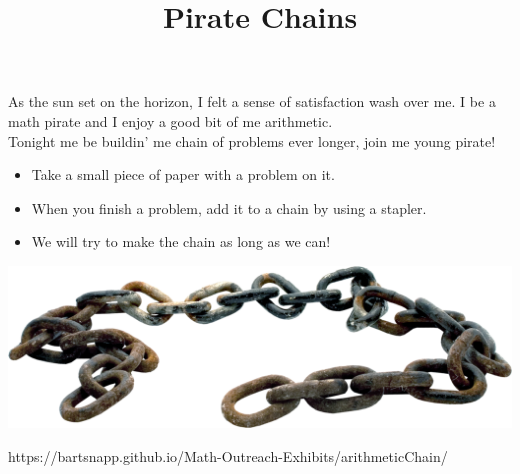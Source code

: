 \documentclass{../exhibit}
\title{Pirate Chains}
\begin{document}
\begin{context}
  As the sun set on the horizon, I felt a sense of satisfaction wash
  over me. I be a math pirate and I enjoy a good bit of me
  arithmetic.
  \\[1cm]
  Tonight me be buildin' me chain of
  problems ever longer, join me young pirate!
\end{context}

\begin{directions}
  \begin{itemize}
\item Take a small piece of paper with a problem on it.
\item When you finish a problem, add it to a chain by using a stapler.
\item We will try to make the chain as long as we can!
\end{itemize}
\end{directions}

\begin{example}%
  \begin{center}
    \includegraphics[width=.9\textwidth]{chain.png}
  \end{center}
\end{example}

\begin{mathConnections}
  https://bartsnapp.github.io/Math-Outreach-Exhibits/arithmeticChain/
\end{mathConnections}
\end{document}
